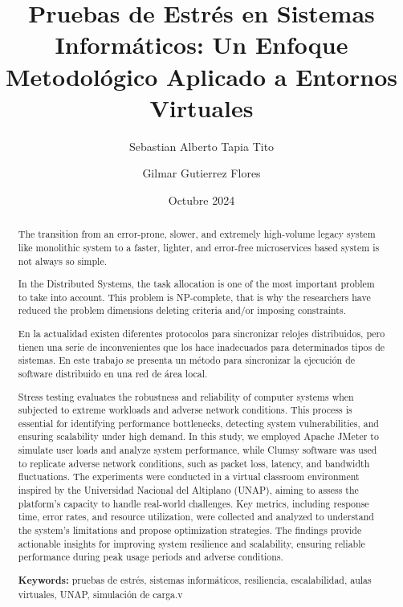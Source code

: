 \documentclass{article}
\title{Pruebas de Estrés en Sistemas Informáticos: Un Enfoque Metodológico Aplicado a Entornos Virtuales}
\author[1]{Sebastian Alberto Tapia Tito}
\author[2]{Gilmar Gutierrez Flores}
\affil[1]{Universidad Nacional del Altiplano}
\date{Octubre 2024}
\begin{document}
\doublespacing

\maketitle

\begin{abstract}
The transition from an error-prone, slower, and extremely high-volume legacy system like monolithic system to a faster, lighter, and error-free microservices based system is not always so simple.\parencite{Aggarwal2024854}

In the Distributed Systems, the task allocation is one of the most important problem to take into account. This problem is NP-complete, that is why the researchers have reduced the problem dimensions deleting criteria and/or imposing constraints.\parencite{Aguilar_Castro1997203}

 En la actualidad existen diferentes protocolos para sincronizar relojes distribuidos, pero tienen una serie de inconvenientes que los hace inadecuados para determinados tipos de sistemas. En este trabajo se presenta un método para sincronizar la ejecución de software distribuido en una red de área local. \parencite{Azketa2021113}

Stress testing evaluates the robustness and reliability of computer systems when subjected to extreme workloads and adverse network conditions. This process is essential for identifying performance bottlenecks, detecting system vulnerabilities, and ensuring scalability under high demand. In this study, we employed Apache JMeter to simulate user loads and analyze system performance, while Clumsy software was used to replicate adverse network conditions, such as packet loss, latency, and bandwidth fluctuations. The experiments were conducted in a virtual classroom environment inspired by the Universidad Nacional del Altiplano (UNAP), aiming to assess the platform's capacity to handle real-world challenges. Key metrics, including response time, error rates, and resource utilization, were collected and analyzed to understand the system's limitations and propose optimization strategies. The findings provide actionable insights for improving system resilience and scalability, ensuring reliable performance during peak usage periods and adverse conditions.

\textbf{Keywords:} pruebas de estrés, sistemas informáticos, resiliencia, escalabilidad, aulas virtuales, UNAP, simulación de carga.v

\end{abstract}
\end{document}

